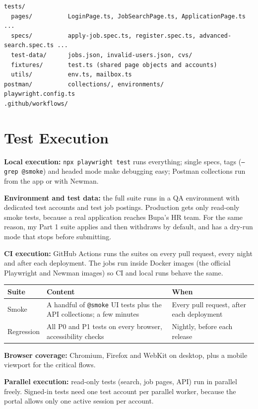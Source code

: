 \documentclass[11pt,a4paper]{article}
\begin{document}
\begin{lstlisting}
tests/
  pages/          LoginPage.ts, JobSearchPage.ts, ApplicationPage.ts ...
  specs/          apply-job.spec.ts, register.spec.ts, advanced-search.spec.ts ...
  test-data/      jobs.json, invalid-users.json, cvs/
  fixtures/       test.ts (shared page objects and accounts)
  utils/          env.ts, mailbox.ts
postman/          collections/, environments/
playwright.config.ts
.github/workflows/
\end{lstlisting}

\section{Test Execution}

\textbf{Local execution:} \texttt{npx playwright test} runs everything; single specs, tags (\texttt{--grep @smoke})
and headed mode make debugging easy; Postman collections run from the app or with Newman.

\textbf{Environment and test data:} the full suite runs in a QA environment with dedicated test accounts and
test job postings. Production gets only read-only smoke tests, because a real application reaches Bupa's HR team.
For the same reason, my Part 1 suite applies and then withdraws by default, and has a dry-run mode that stops
before submitting.

\textbf{CI execution:} GitHub Actions runs the suites on every pull request, every night and after each deployment.
The jobs run inside Docker images (the official Playwright and Newman images) so CI and local runs behave the same.

\begin{tabularx}{\linewidth}{@{}L{2.3cm}Y L{3.3cm}@{}}
\toprule
\textbf{Suite} & \textbf{Content} & \textbf{When} \\
\midrule
Smoke & A handful of \texttt{@smoke} UI tests plus the API collections; a few minutes & Every pull request, after each deployment \\
Regression & All P0 and P1 tests on every browser, accessibility checks & Nightly, before each release \\
\bottomrule
\end{tabularx}

\textbf{Browser coverage:} Chromium, Firefox and WebKit on desktop, plus a mobile viewport for the critical flows.

\textbf{Parallel execution:} read-only tests (search, job pages, API) run in parallel freely. Signed-in tests need
one test account per parallel worker, because the portal allows only one active session per account.
\end{document}
